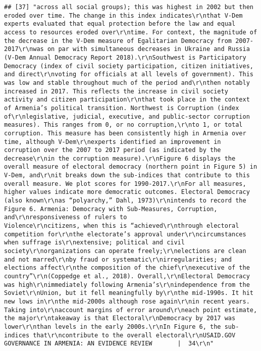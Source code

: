 \documentclass[
]{article}
\begin{document}
\begin{verbatim}
## [37] "across all social groups); this was highest in 2002 but then eroded over time. The change in this index indicates\r\nthat V-Dem experts evaluated that equal protection before the law and equal access to resources eroded over\r\ntime. For context, the magnitude of the decrease in the V-Dem measure of Egalitarian Democracy from 2007-2017\r\nwas on par with simultaneous decreases in Ukraine and Russia (V-Dem Annual Democracy Report 2018).\r\nSouthwest is Participatory Democracy (index of civil society participation, citizen initiatives, and direct\r\nvoting for officials at all levels of government). This was low and stable throughout much of the period and\r\nthen notably increased in 2017. This reflects the increase in civil society activity and citizen participation\r\nthat took place in the context of Armenia’s political transition. Northwest is Corruption (index of\r\nlegislative, judicial, executive, and public-sector corruption measures). This ranges from 0, or no corruption,\r\nto 1, or total corruption. This measure has been consistently high in Armenia over time, although V-Dem\r\nexperts identified an improvement in corruption over the 2007 to 2017 period (as indicated by the decrease\r\nin the corruption measure).\r\nFigure 6 displays the overall measure of electoral democracy (northern point in Figure 5) in V-Dem, and\r\nit breaks down the sub-indices that contribute to this overall measure. We plot scores for 1990-2017.\r\nFor all measures, higher values indicate more democratic outcomes. Electoral Democracy (also known\r\nas “polyarchy,” Dahl, 1973)\r\nintends to record the                      Figure 6. Armenia: Democracy with Sub-Measures, Corruption, and\r\nresponsiveness of rulers to                Violence\r\ncitizens, when this is “achieved\r\nthrough electoral competition for\r\nthe electorate’s approval under\r\ncircumstances when suffrage is\r\nextensive; political and civil society\r\norganizations can operate freely;\r\nelections are clean and not marred\r\nby fraud or systematic\r\nirregularities; and elections affect\r\nthe composition of the chief\r\nexecutive of the country”\r\n(Coppedge et al., 2018). Overall,\r\nElectoral Democracy was high\r\nimmediately following Armenia’s\r\nindependence from the Soviet\r\nUnion, but it fell meaningfully by\r\nthe mid-1990s. It hit new lows in\r\nthe mid-2000s although rose again\r\nin recent years. Taking into\r\naccount margins of error around\r\neach point estimate, the major\r\ntakeaway is that Electoral\r\nDemocracy by 2017 was lower\r\nthan levels in the early 2000s.\r\nIn Figure 6, the sub-indices that\r\ncontribute to the overall electoral\r\nUSAID.GOV                                                     GOVERNANCE IN ARMENIA: AN EVIDENCE REVIEW       |  34\r\n"                                                                                                                                                                                                                                                                                                                                                                                                                                                                                                                                               
\end{verbatim}
\end{document}
